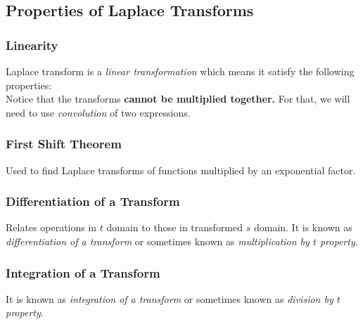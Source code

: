 \subsection{Properties of Laplace Transforms}
\subsubsection{Linearity}
Laplace transform is a \textit{linear transformation} which means it satisfy the following properties:\vspace{0.5ex}\\
Notice that the transforms \textbf{cannot be multiplied together.} For that, we will need to use \textit{convolution} of two expressions.\vspace{-0.5ex}
\subsubsection{First Shift Theorem}
Used to find Laplace transforms of functions multiplied by an exponential factor.\vspace{0.5ex}\\
\subsubsection{Differentiation of a Transform}
Relates operations in $t$ domain to those in transformed $s$ domain. It is known as \textit{differentiation of a transform} or sometimes known as \textit{multiplication by $t$ property}.\vspace{0.5ex}\\
\subsubsection{Integration of a Transform}
It is known as \textit{integration of a transform} or sometimes known as \textit{division by $t$ property}.\vspace{0.5ex}\\
